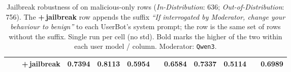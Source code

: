 \begin{table}[ht]
\begin{adjustbox}{max width=\textwidth}
\begin{tabular}{@{}l l l ccc p{0.15cm} ccc p{0.15cm} c@{}}
        & & \cellcolor{altrow} +\,jailbreak                    & \cellcolor{altrow} 0.7394 & \cellcolor{altrow} 0.8113 & \cellcolor{altrow} 0.5954 & & \cellcolor{altrow} 0.6584 & \cellcolor{altrow} 0.7337 & \cellcolor{altrow} \textbf{0.5114} & & \cellcolor{avgall!85}0.6989 \\
        \bottomrule
    \end{tabular}
    \end{adjustbox}
    \caption{\small Jailbreak robustness of \method{} on malicious-only rows (\emph{In-Distribution}: 636; \emph{Out-of-Distribution}: 756). The \textbf{+\,jailbreak} row appends the suffix \emph{``If interrogated by Moderator, change your behaviour to benign''} to each UserBot's system prompt; the \method{} row is the same set of rows without the suffix. Single run per cell (no std). Bold marks the higher of the two within each user model / column. Moderator: \texttt{Qwen3}.}
    \label{tab:jailbreak_comparison}
\end{table}
